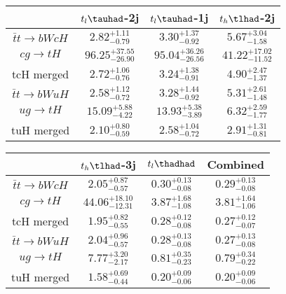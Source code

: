 \centering
\begin{tabular}{|c|c|c|c|} \hline
 & $t_l\tauhad$-2j & $t_l\tauhad$-1j & $t_h\tlhad$-2j\\\hline
$\bar{t}t\to bWcH$ & $2.82^{+1.11}_{-0.79}$ & $3.30^{+1.37}_{-0.92}$ & $5.67^{+3.04}_{-1.58}$\\\hline
$cg\to tH$ & $96.25^{+37.55}_{-26.90}$ & $95.04^{+36.26}_{-26.56}$ & $41.22^{+17.02}_{-11.52}$\\\hline
tcH merged & $2.72^{+1.06}_{-0.76}$ & $3.24^{+1.38}_{-0.91}$ & $4.90^{+2.47}_{-1.37}$\\\hline
$\bar{t}t\to bWuH$ & $2.58^{+1.12}_{-0.72}$ & $3.28^{+1.44}_{-0.92}$ & $5.31^{+2.61}_{-1.48}$\\\hline
$ug\to tH$ & $15.09^{+5.88}_{-4.22}$ & $13.93^{+5.38}_{-3.89}$ & $6.32^{+2.59}_{-1.77}$\\\hline
tuH merged & $2.10^{+0.80}_{-0.59}$ & $2.58^{+1.04}_{-0.72}$ & $2.91^{+1.31}_{-0.81}$\\\hline
\end{tabular}
\begin{tabular}{|c|c|c|c|} \hline
 & $t_h\tlhad$-3j & $t_l\thadhad$ & Combined\\\hline
$\bar{t}t\to bWcH$ & $2.05^{+0.87}_{-0.57}$ & $0.30^{+0.13}_{-0.08}$ & $0.29^{+0.13}_{-0.08}$\\\hline
$cg\to tH$ & $44.06^{+18.10}_{-12.31}$ & $3.87^{+1.68}_{-1.08}$ & $3.81^{+1.64}_{-1.06}$\\\hline
tcH merged & $1.95^{+0.82}_{-0.55}$ & $0.28^{+0.12}_{-0.08}$ & $0.27^{+0.12}_{-0.07}$\\\hline
$\bar{t}t\to bWuH$ & $2.04^{+0.96}_{-0.57}$ & $0.28^{+0.13}_{-0.08}$ & $0.27^{+0.13}_{-0.08}$\\\hline
$ug\to tH$ & $7.77^{+3.20}_{-2.17}$ & $0.81^{+0.35}_{-0.23}$ & $0.79^{+0.34}_{-0.22}$\\\hline
tuH merged & $1.58^{+0.69}_{-0.44}$ & $0.20^{+0.09}_{-0.06}$ & $0.20^{+0.09}_{-0.06}$\\\hline
\end{tabular}

